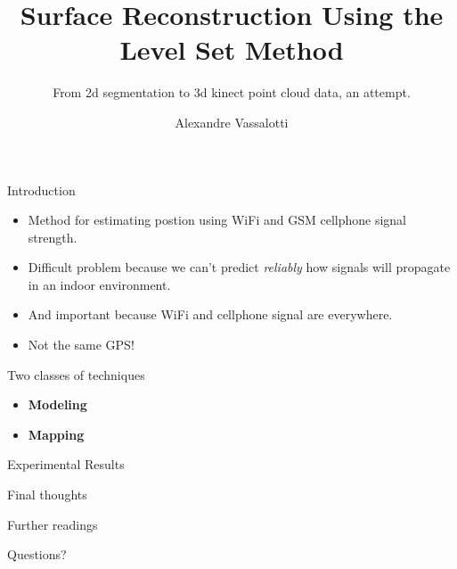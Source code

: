 \documentclass{beamer}
\title{Surface Reconstruction Using the Level Set Method}
\subtitle{From 2d segmentation to 3d kinect point cloud data, an attempt.} %
\author{Alexandre Vassalotti}
\begin{document}
\begin{frame}[plain]
  \titlepage
\end{frame}

\begin{frame}{Introduction}
  \begin{itemize}
  \item Method for estimating postion using WiFi and GSM cellphone signal
    strength.
  \item Difficult problem because we can't predict \emph{reliably} how signals
    will propagate in an indoor environment.
  \item And important because WiFi and cellphone signal are everywhere.
  \item Not the same GPS!
  \end{itemize}
\end{frame}

\begin{frame}{Two classes of techniques}
  \begin{itemize}
  \item \textbf{Modeling}
  \item \textbf{Mapping}
  \end{itemize}
\end{frame}

\begin{frame}{Experimental Results}

\end{frame}

\begin{frame}{Final thoughts}

\end{frame}

\begin{frame}{Further readings}

\end{frame}

\begin{frame}{Questions?}
  
\end{frame}
\end{document}
